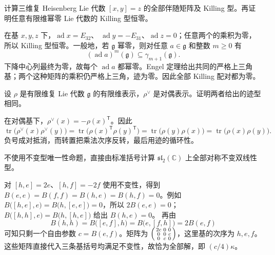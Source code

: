 \begin{exercise}\label{b5:ex:13-heisenberg-killing}
	计算三维复 Heisenberg Lie 代数 \([x,y]=z\) 的全部伴随矩阵及 Killing 型。再证明任意有限维幂零 Lie 代数的 Killing 型恒零。
\end{exercise}
\begin{solution}
	在基 \(x,y,z\) 下，\(\operatorname{ad}x=E_{32}\)、 \(\operatorname{ad}y=-E_{31}\)、\(\operatorname{ad}z=0\)；任意两个的乘积为零，所以 Killing 型恒零。一般地，若 \(\mathfrak g\) 幂零，则对任意 \(a\in\mathfrak g\) 和整数 \(m\ge0\) 有
	\[
		(\operatorname{ad}a)^m(\mathfrak g)\subseteq\gamma_{m+1}(\mathfrak g).
	\]
	下降中心列最终为零，故每个 \(\operatorname{ad}a\) 都幂零。Engel 定理给出共同的严格上三角基；两个这种矩阵的乘积仍严格上三角，迹为零。因此全部 Killing 配对都为零。
\end{solution}

\begin{exercise}\label{b5:ex:13-dual-trace}
	设 \(\rho\) 是有限维复 Lie 代数 \(\mathfrak g\) 的有限维表示，\(\rho^\vee\) 是对偶表示。证明两者给出的迹型相同。
\end{exercise}
\begin{solution}
	在对偶基下，\(\rho^\vee(x)=-\rho(x)^{\mathsf T}\)。因此
	\[
		\operatorname{tr}\bigl(\rho^\vee(x)\rho^\vee(y)\bigr) =\operatorname{tr}\bigl(\rho(x)^{\mathsf T}\rho(y)^{\mathsf T}\bigr) =\operatorname{tr}\bigl(\rho(y)\rho(x)\bigr) =\operatorname{tr}\bigl(\rho(x)\rho(y)\bigr).
	\]
	负号成对抵消，而转置把乘法次序反转，最后用迹的循环性。
\end{solution}

\begin{exercise}\label{b5:ex:13-sl2-invariant-direct}
	不使用不变型唯一性命题，直接由标准括号计算 \(\mathfrak{sl}_2(\mathbb C)\) 上全部对称不变双线性型。
\end{exercise}
\begin{solution}
	对 \([h,e]=2e\)、\([h,f]=-2f\) 使用不变性，得到 \(B(e,e)=B(f,f)=B(h,e)=B(h,f)=0\)。例如 \(B\bigl([h,e],e\bigr)=B\bigl(h,[e,e]\bigr)=0\)，所以 \(2B(e,e)=0\)； \(B\bigl([h,h],e\bigr)=B\bigl(h,[h,e]\bigr)\) 给出 \(B(h,e)=0\)。 再由
	\[
		B(h,h)=B\bigl([e,f],h\bigr)=B\bigl(e,[f,h]\bigr)=2B(e,f)
	\]
	可知只剩一个自由参数 \(c=B(e,f)\)。矩阵为
	\(\begin{psmallmatrix}2c&0&0\\0&0&c\\0&c&0\end{psmallmatrix}\)，这里基的次序为 \(h,e,f\)。这些矩阵直接代入三条基括号均满足不变性，故恰为全部解，即 \((c/4)\kappa\)。
\end{solution}

